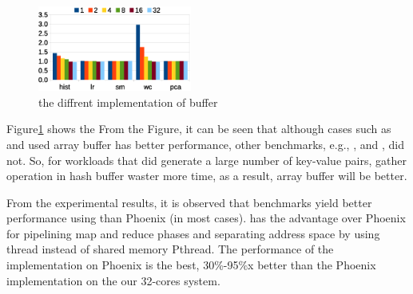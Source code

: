 \begin{figure}[!h!t]  
	\centering
	\includegraphics[width=0.45\textwidth]{eps/smr_diff_buffer.eps}
	\caption{the diffrent implementation of buffer}
	\label{fig:smr:diff:buffer}
\end{figure}

Figure\ref{fig:smr:diff:buffer} shows the 
From the Figure, it can be seen that although cases such as  and  used array buffer has better performance, other benchmarks, e.g., ,  and , did not.
So, for workloads that did generate a large number of key-value pairs, gather operation in hash buffer waster more time, as a result, array buffer will be better.

From the experimental results, it is observed that benchmarks yield better performance using \myds than Phoenix (in most cases). 
\myds has the advantage over Phoenix for pipelining map and reduce phases and separating address space by using \myth thread instead of shared memory Pthread. 
The performance of the  implementation on Phoenix is the best, 30\%-95\%x better than the Phoenix implementation on the our 32-cores system.

